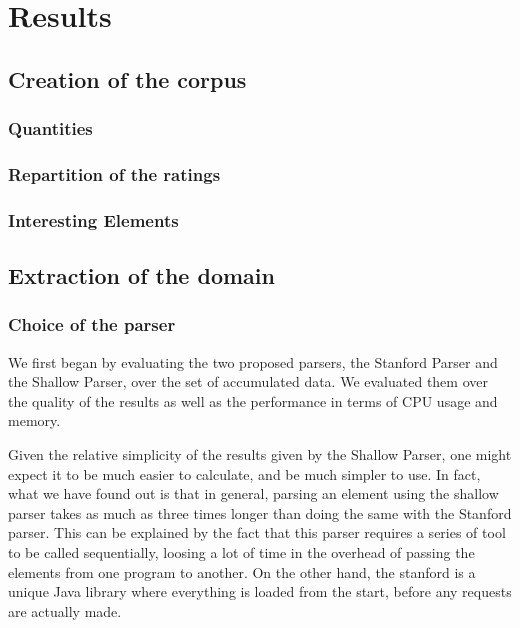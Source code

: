 \chapter{Results} %
\label{cha:results}

\section{Creation of the corpus} %
\label{sec:creation_of_the_corpus_results}

\subsection{Quantities} %
\label{sub:quantities}


\subsection{Repartition of the ratings} %
\label{sub:repartition_of_the_ratings}


\subsection{Interesting Elements} %
\label{sub:interesting_elements}



\section{Extraction of the domain} %
\label{sec:extraction_of_the_domain}

\subsection{Choice of the parser} %
\label{sub:choice_of_the_parser}

We first began by evaluating the two proposed parsers, the Stanford Parser and the Shallow Parser, over the set of accumulated data. We evaluated them over the quality of the results as well as the performance in terms of CPU usage and memory.

Given the relative simplicity of the results given by the Shallow Parser, one might expect it to be much easier to calculate, and be much simpler to use. In fact, what we have found out is that in general, parsing an element using the shallow parser takes as much as three times longer than doing the same with the Stanford parser. This can be explained by the fact that this parser requires a series of tool to be called sequentially, loosing a lot of time in the overhead of passing the elements from one program to another. On the other hand, the stanford is a unique Java library where everything is loaded from the start, before any requests are actually made.

